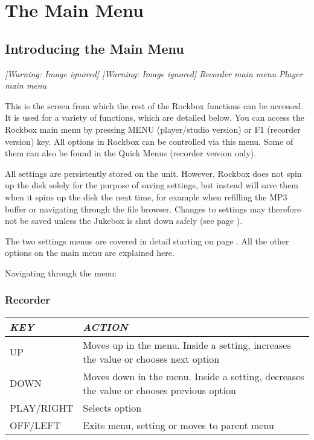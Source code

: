 \chapter{The Main Menu}
\newpage

\section{Introducing the Main Menu}
{\centering\itshape
  [Warning: Image ignored] %
 \textmd{  }  [Warning: Image ignored]
 \newline
Recorder main menu  Player main menu  
\par}

This is the screen from which the rest of the
Rockbox functions can be accessed.  It is used for a variety of
functions, which are detailed below. You can access the Rockbox main
menu by pressing MENU (player/studio version) or F1 (recorder version)
key. All options in Rockbox can be controlled via this menu. Some of
them can also be found in the Quick Menus (recorder version only).

All settings are persistently stored on the unit. However, Rockbox does
not spin up the disk solely for the purpose of saving settings, but
instead will save them when it spins up the disk the next time, for
example when refilling the MP3 buffer or navigating through the file
browser. Changes to settings may therefore not be saved unless the
Jukebox is shut down safely (see page \pageref{ref:Safeshutdown}).

The two settings menus are covered in detail starting on page \pageref{ref:Part4}.
 All the other options on the main menu are explained here.

Navigating through the menu:

\subsection{Recorder}

\begin{tabular}[c]{|p{3.27cm}|p{13.318cm}|}
\hline
{\centering\bfseries\itshape
KEY
\par}
&
{\centering\bfseries\itshape
ACTION
\par}
\\\hline
{\centering
UP
\par}
&
Moves up in the menu. Inside a setting, increases the value or chooses
next option
\\\hline
{\centering
DOWN
\par}
&
Moves down in the menu. Inside a setting, decreases the value or chooses
previous option 
\\\hline
{\centering
PLAY/RIGHT
\par}
&
Selects option
\\\hline
{\centering
OFF/LEFT
\par}
&
Exits menu, setting or moves to parent menu
\\\hline
\end{tabular}
